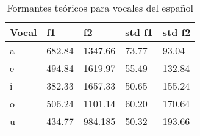 \begin{table}[H]
\centering
\caption{Formantes teóricos para vocales del español}
\label{tab:formantes_observador}
\begin{tabular}{|l|l|l|l|l|}
\textbf{Vocal} & \textbf{f1} & \textbf{f2} & \textbf{std f1} & \textbf{std f2} \\ \hline
a   & 682.84 & 1347.66 & 73.77 & 93.04 \\ \hline
e   & 494.84 & 1619.97 & 55.49 & 132.84\\ \hline
i   & 382.33 & 1657.33 & 50.65 & 155.24 \\ \hline
o   & 506.24 & 1101.14 & 60.20 & 170.64\\ \hline
u   & 434.77 & 984.185 & 50.32 & 193.66\\ \hline

\end{tabular}
\end{table}